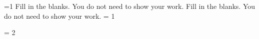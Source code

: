 \ifnum {} 
    \renewcommand{\TwoPartPageTwo}{1}
\fi 
\ifnum {}
    \renewcommand{\TwoPartPageTwo}{1}
\fi 
\ifnum {}
    \renewcommand{\TwoPartPageTwo}{1}
\fi 
\ifnum {}
    \renewcommand{\TwoPartPageTwo}{1}
\fi 

\ifnum \TwoPartPageTwo=1
    \question[6] Fill in the blanks. You do not need to show your work. 
\else 
    \question[8] Fill in the blanks. You do not need to show your work. 
\fi 
\ifnum \SetNumber = 1
    \begin{parts} 
        
        
        
        
        
        
        
        
    \end{parts}
\fi 
\ifnum \SetNumber = 2
    \begin{parts} 
        
        
        
                
        
        
        
        
    \end{parts}
\fi 